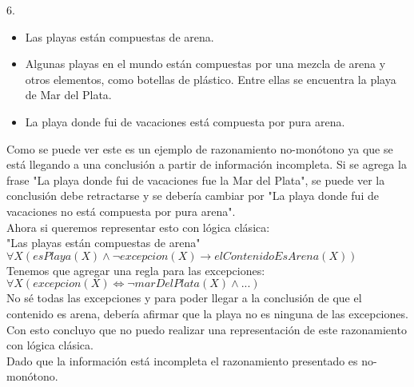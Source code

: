 6. 
\begin{itemize}
	\item Las playas están compuestas de arena.
	\item Algunas playas en el mundo están compuestas por una mezcla de arena y otros elementos, como botellas de plástico. Entre ellas se encuentra la playa de Mar del Plata.
	\item La playa donde fui de vacaciones está compuesta por pura arena.
\end{itemize}

Como se puede ver este es un ejemplo de razonamiento no-monótono ya que se está llegando a una conclusión a partir de información incompleta. Si se agrega la frase "La playa donde fui de vacaciones fue la Mar del Plata", se puede ver la conclusión debe retractarse y se debería cambiar por "La playa donde fui de vacaciones no está compuesta por pura arena". \\

Ahora si queremos representar esto con lógica clásica: \\

"Las playas están compuestas de arena" \\

$\forall X (esPlaya(X) \land \neg excepcion(X) \longrightarrow elContenidoEsArena(X))$ \\

Tenemos que agregar una regla para las excepciones: \\

$\forall X (excepcion(X) \iff \neg marDelPlata(X) \land ... )$ \\

No sé todas las excepciones y para poder llegar a la conclusión de que el contenido es arena, debería afirmar que la playa no es ninguna de las excepciones. Con esto concluyo que no puedo realizar una representación de este razonamiento con lógica clásica. \\

Dado que la información está incompleta el razonamiento presentado es no-monótono. 

\bigskip